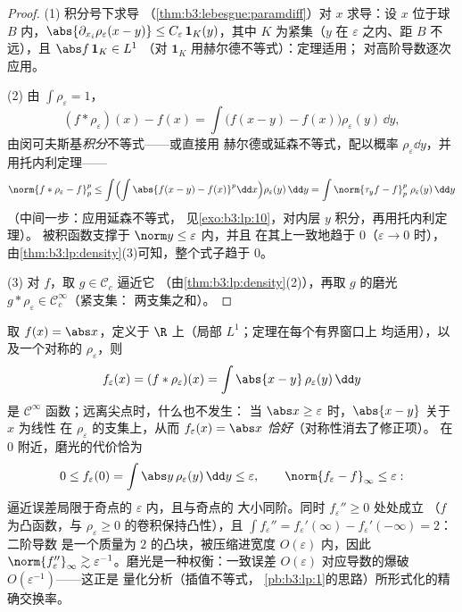 \begin{proof}
(1) 积分号下求导
（\cref{thm:b3:lebesgue:paramdiff}）对 $x$ 求导：设 $x$ 位于球 
$B$ 内，$\abs{\partial_{x_i}\rho_\varepsilon(x - y)} \leq
C_\varepsilon\,\mathbf 1_{K}(y)$，其中 $K$ 为紧集（$y$
在 $\varepsilon$ 之内、距 $B$ 不远），且 $\abs f\,\mathbf 1_K \in L^1$
（对 $\mathbf 1_K$ 用赫尔德不等式）：定理适用；
对高阶导数逐次应用。

(2) 由 $\int\rho_\varepsilon = 1$，
\[
(f * \rho_\varepsilon)(x) - f(x)
= \int \bigl(f(x - y) - f(x)\bigr)\rho_\varepsilon(y)\,\dd y ,
\]
由闵可夫斯基\emph{积分}不等式——或直接用
赫尔德或延森不等式，配以概率
$\rho_\varepsilon\dd y$，并用托内利定理——
\[
\norm{f*\rho_\varepsilon - f}_p^p
\leq \int\Bigl(\int\abs{f(x-y) -
f(x)}^p\dd x\Bigr)\rho_\varepsilon(y)\,\dd y
= \int \norm{\tau_yf - f}_p^p\;\rho_\varepsilon(y)\,\dd y
\]
（中间一步：应用延森不等式，
见\cref{exo:b3:lp:10}，对内层 $y$ 积分，再用托内利定理）。
被积函数支撑于 $\norm y \leq \varepsilon$ 内，并且
在其上一致地趋于 $0$（$\varepsilon \to 0$ 时），
由\cref{thm:b3:lp:density}(3)可知，整个式子趋于
$0$。

(3) 对 $f$，取 $g \in \mathcal C_c$ 逼近它
（由\cref{thm:b3:lp:density}(2)），再取 $g$ 的磨光 $g *
\rho_\varepsilon \in \mathcal C_c^\infty$（紧支集：
两支集之和）。
\end{proof}

\begin{example}
\label{ex:b3:lp:mollifyexample}
取 $f(x) = \abs x$，定义于 $\R$ 上（局部 $L^1$；定理在每个有界窗口上
均适用），以及一个对称的
$\rho_\varepsilon$，则
\[
f_\varepsilon(x) = (f * \rho_\varepsilon)(x)
= \int\abs{x - y}\,\rho_\varepsilon(y)\,\dd y
\]
是 $\mathcal C^\infty$ 函数；远离尖点时，什么也不发生：
当 $\abs x \geq \varepsilon$ 时，$\abs{x - y}$ 关于 $x$ 为线性
在 $\rho_\varepsilon$ 的支集上，从而 $f_\varepsilon(x) =
\abs x$ \emph{恰好}（对称性消去了修正项）。
在 $0$ 附近，磨光的代价恰为
\[
0 \leq f_\varepsilon(0) = \int\abs
y\,\rho_\varepsilon(y)\,\dd y \leq \varepsilon,
\qquad
\norm{f_\varepsilon - f}_\infty \leq \varepsilon :
\]
逼近误差局限于奇点的
$\varepsilon$ 内，且与奇点的
大小同阶。同时 $f_\varepsilon'' \geq 0$ 处处成立
（$f$ 为凸函数，与 $\rho_\varepsilon
\geq 0$ 的卷积保持凸性），且 $\int f_\varepsilon'' =
f_\varepsilon'(\infty) - f_\varepsilon'(-\infty) = 2$：二阶导数
是一个质量为 $2$ 的凸块，被压缩进宽度
$O(\varepsilon)$ 内，因此 $\norm{f_\varepsilon''}_\infty \gtrsim
\varepsilon^{-1}$。磨光是一种权衡：一致误差
$O(\varepsilon)$ 对应导数的爆破
$O(\varepsilon^{-1})$——这正是
量化分析（插值不等式，
\cref{pb:b3:lp:1}的思路）所形式化的精确交换率。
\end{example}

